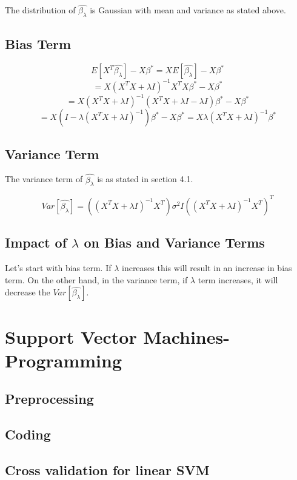 \documentclass[letter,11pt]{article}
\begin{document}
	The distribution of $\hat{\beta_\lambda}$ is Gaussian with mean and variance as stated above.
	
	\subsection{Bias Term}
	
	$$E[X^T\hat{\beta_\lambda}] - X\beta^* = XE[\hat{\beta_\lambda}] - X\beta^*$$ $$= X(X^TX + \lambda I)^{-1} X^TX\beta^* - X\beta^*$$
	$$ =X(X^TX + \lambda I)^{-1} (X^TX + \lambda I - \lambda I)\beta^* -X\beta^*$$
	$$ = X(I - \lambda(X^TX + \lambda I)^{-1})\beta^* -X\beta^* = X\lambda(X^TX+\lambda I)^{-1}\beta^*$$
	
	\subsection{Variance Term}
	
	The variance term of $\hat{\beta_\lambda}$ is as stated in section 4.1.
	
	$$Var[\hat{\beta_\lambda}] = ((X^TX + \lambda I)^{-1}X^T) \sigma^2 I ((X^TX + \lambda I)^{-1}X^T)^T$$

	\subsection{Impact of $\lambda$ on Bias and Variance Terms}
	
	Let's start with bias term. If $\lambda$ increases this will result in an increase in bias term.
	On the other hand, in the variance term, if $\lambda$ term increases, it will decrease the $Var[\hat{\beta_\lambda}]$.

	


\section{Support Vector Machines-Programming}
\subsection{Preprocessing}
\subsection{Coding}
\subsection{Cross validation for linear SVM}
\end{document}
